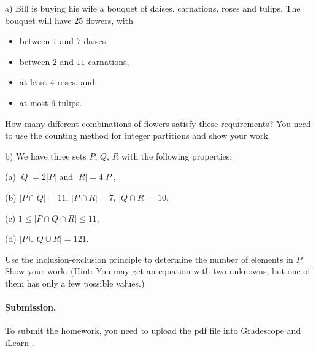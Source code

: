 \documentclass{article}
\begin{document}
\begin{problem}
a) Bill is buying his wife a bouquet of daises, carnations, roses and tulips. 
The bouquet will have $25$ flowers, with 
%
\begin{itemize} 
		\item between $1$ and $7$ daises,
        \item between $2$ and $11$ carnations,
		\item at least $4$ roses, and
		\item at most $6$ tulips. 
\end{itemize}
%
How many different combinations of flowers satisfy these requirements?
You need to use the counting method for integer partitions and show your work.



\bigskip
\noindent 
b) We have three sets $P$, $Q$, $R$
with the following properties:

\begin{description}

\item{(a)}  $|Q| = 2|P|$ and 
                $|R| = 4|P|$,

\item{(b)} $|P\cap Q| = 11$,
        $|P\cap R| = 7$,
        $|Q\cap R| = 10$,

\item{(c)}
$1\le |P\cap Q\cap R| \le 11$,

\item{(d)}
$|P\cup Q\cup R| = 121$.

\end{description}

Use the inclusion-exclusion principle to
determine the number of elements in $P$.
Show your work.
(Hint: You may get an equation with two unknowns, but one of them has only a few possible values.)
\end{problem}




\vskip 0.1in
\paragraph{Submission.}
To submit the homework, you need to upload the pdf file into Gradescope and iLearn .
\end{document}
